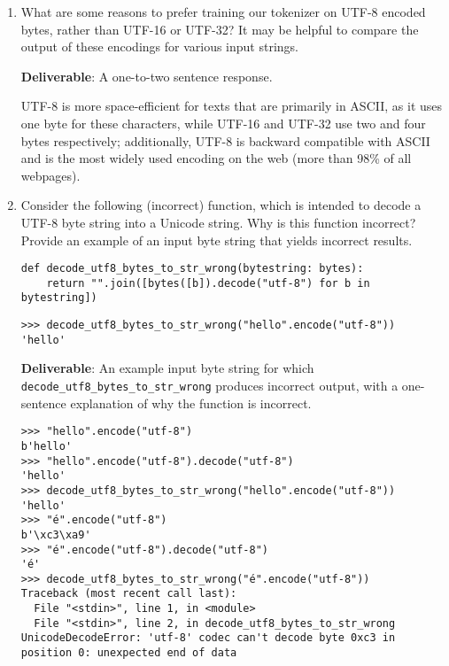\begin{enumerate}[label=(\alph*)]
    \item {What are some reasons to prefer training our tokenizer on UTF-8 encoded bytes, rather than UTF-16 or UTF-32? It may be helpful to compare the output of these encodings for various input strings.}
    
    {\textbf{Deliverable}: A one-to-two sentence response.}
    
    \begin{answer}
    UTF-8 is more space-efficient for texts that are primarily in ASCII, as it uses one byte for these characters, while UTF-16 and UTF-32 use two and four bytes respectively; additionally, UTF-8 is backward compatible with ASCII and is the most widely used encoding on the web (more than 98\% of all webpages).
    \end{answer}
    
    \item {Consider the following (incorrect) function, which is intended to decode a UTF-8 byte string into a Unicode string. Why is this function incorrect? Provide an example of an input byte string that yields incorrect results.}
    
    \begin{lstlisting}
def decode_utf8_bytes_to_str_wrong(bytestring: bytes):
    return "".join([bytes([b]).decode("utf-8") for b in bytestring])
    \end{lstlisting}
    
    \begin{lstlisting}
>>> decode_utf8_bytes_to_str_wrong("hello".encode("utf-8"))
'hello'
    \end{lstlisting}
    
    {\textbf{Deliverable}: An example input byte string for which \texttt{decode\_utf8\_bytes\_to\_str\_wrong} produces incorrect output, with a one-sentence explanation of why the function is incorrect.}
    
    \begin{lstlisting}
>>> "hello".encode("utf-8")
b'hello'
>>> "hello".encode("utf-8").decode("utf-8")
'hello'
>>> decode_utf8_bytes_to_str_wrong("hello".encode("utf-8"))
'hello'
>>> "é".encode("utf-8")
b'\xc3\xa9'
>>> "é".encode("utf-8").decode("utf-8")
'é' 
>>> decode_utf8_bytes_to_str_wrong("é".encode("utf-8"))
Traceback (most recent call last):
  File "<stdin>", line 1, in <module>
  File "<stdin>", line 2, in decode_utf8_bytes_to_str_wrong
UnicodeDecodeError: 'utf-8' codec can't decode byte 0xc3 in position 0: unexpected end of data
    \end{lstlisting}


\end{enumerate}
